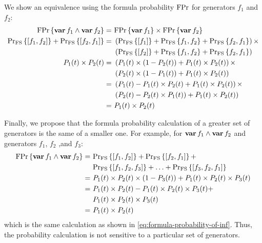 We show an equivalence using the formula probability $\mathrm{FPr}$ for generators $f_1$ and $f_2$:
\begin{align}
\mathrm{FPr}\left\{\operatorname{\mathbf{var}} f_1 \land \operatorname{\mathbf{var}} f_2\right\} = &~ \mathrm{FPr}\left\{\operatorname{\mathbf{var}} f_1\right\} \times \mathrm{FPr}\left\{\operatorname{\mathbf{var}} f_2\right\}\label{eq:formula-probability-of-inf}\\
\mathrm{Pr_{FS}}\left\{\left[ f_1,f_2 \right]\right\} + \mathrm{Pr_{FS}}\left\{\left[ f_2,f_1 \right]\right\} = &~
  \left(\mathrm{Pr_{FS}}\left\{\left[ f_1 \right]\right\} + 
     \mathrm{Pr_{FS}}\left\{f_1,f_2\right\} + 
     \mathrm{Pr_{FS}}\left\{f_2,f_1\right\}\right) \times\nonumber\\
  &~\left(\mathrm{Pr_{FS}}\left\{\left[ f_2 \right]\right\} + 
    \mathrm{Pr_{FS}}\left\{f_1,f_2\right\} + 
    \mathrm{Pr_{FS}}\left\{f_2,f_1\right\}\right)\nonumber\\
P_1(t) \times P_2(t) = &~ 
  \left(P_1(t) \times (1 - P_2(t)) + P_1(t) \times P_2(t)\right) \times\nonumber\\
  &~ \left(P_2(t) \times (1 - P_1(t)) + P_1(t) \times P_2(t)\right) \nonumber\\
= &~
  \left(P_1(t) - P_1(t)\times P_2(t) + P_1(t) \times P_2(t)\right) \times\nonumber\\
  &~ \left(P_2(t) - P_2(t) \times P_1(t)) + P_1(t) \times P_2(t)\right) \nonumber\\
= &~
  P_1(t) \times P_2(t)\nonumber
\end{align}

Finally, we propose that the formula probability calculation of a greater set of generators is the same of a smaller one.
For example, for $\operatorname{\mathbf{var}} f_1 \land \operatorname{\mathbf{var}} f_2$ and generators $f_1$, $f_2$ ,and $f_3$:
\begin{align}
\mathrm{FPr}\left\{\operatorname{\mathbf{var}} f_1 \land \operatorname{\mathbf{var}} f_2\right\} =&~
  \mathrm{Pr_{FS}}\left\{\left[ f_1,f_2 \right]\right\} +
  \mathrm{Pr_{FS}}\left\{\left[ f_2,f_1 \right]\right\} + \nonumber\\
  &~\mathrm{Pr_{FS}}\left\{\left[ f_1,f_2,f_3 \right]\right\} +
  \ldots +
  \mathrm{Pr_{FS}}\left\{\left[ f_3,f_2,f_1 \right]\right\} \nonumber\\
= &~ P_1(t) \times P_2(t) \times (1 - P_3(t)) + P_1(t) \times P_2(t) \times P_3(t)\nonumber\\
= &~ P_1(t) \times P_2(t) - P_1(t) \times P_2(t) \times P_3(t) + \nonumber\\
  &~ P_1(t) \times P_2(t) \times P_3(t)\nonumber\\
= &~ P_1(t) \times P_2(t)\label{eq:formula-probability-any-generators}
\end{align}
%
which is the same calculation as shown in \cref{eq:formula-probability-of-inf}.
Thus, the probability calculation is not sensitive to a particular set of generators.


